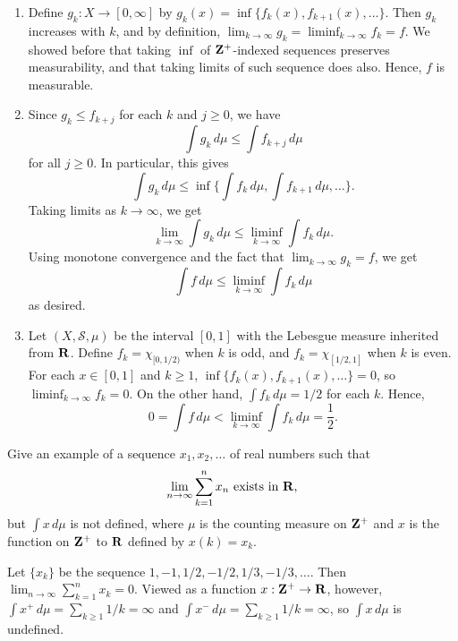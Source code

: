 \documentclass[11pt,oneside]{book}
\begin{document}
\begin{solution}
    \begin{enumerate}[label=(\alph*)]
        \item Define $g_k: X \to [0, \infty]$ by $g_k(x) = \inf\{f_k(x), f_{k+1}(x), \ldots\}$. Then $g_k$ increases with $k$, and by definition, $\lim_{k \to \infty} g_k = \liminf_{k \to \infty} f_k = f$. We showed before that taking $\inf$ of $\mathbf{Z}^+$-indexed sequences preserves measurability, and that taking limits of such sequence does also. Hence, $f$ is measurable.

        \item Since $g_k \leq f_{k+j}$ for each $k$ and $j \geq 0$, we have \[\int g_k \, d\mu \leq \int f_{k+j} \, d\mu\] for all $j \geq 0$. In particular, this gives \[\int g_k \, d\mu \leq \inf\bigg\{ \int f_{k} \, d\mu, \int f_{k+1} \, d\mu, \ldots \bigg\}.\] Taking limits as $k \to \infty$, we get \[\lim_{k \to \infty} \int g_k \, d\mu \leq \liminf_{k \to \infty} \int f_k \, d\mu.\] Using monotone convergence and the fact that $\lim_{k \to \infty} g_k = f$, we get \[\int f \, d\mu \leq \liminf_{k \to \infty} \int f_k \, d\mu\] as desired.

        \item Let $(X, \mathscr{S}, \mu)$ be the interval $[0, 1]$ with the Lebesgue measure inherited from $\mathbf{R}$. Define $f_k = \chi_{[0, 1/2)}$ when $k$ is odd, and $f_k = \chi_{[1/2, 1]}$ when $k$ is even. For each $x \in [0, 1]$ and $k \geq 1$, $\inf\{f_k(x), f_{k+1}(x), \ldots\} = 0$, so $\liminf_{k \to \infty} f_k = 0$. On the other hand, $\int f_k \, d\mu = 1/2$ for each $k$. Hence, \[0 = \int f \, d\mu < \liminf_{k \to \infty} \int f_k \, d\mu = \frac 12.\]
    \end{enumerate}
\end{solution}

\begin{exercise}
    Give an example of a sequence $x_1, x_2, \ldots$ of real numbers such that \[\lim_{n \to \infty} \sum_{k=1}^n x_n \text{ exists in $\mathbf{R}$,}\] but $\int x \, d\mu$ is not defined, where $\mu$ is the counting measure on $\mathbf{Z}^+$ and $x$ is the function on $\mathbf{Z}^+$ to $\mathbf{R}$ defined by $x(k) = x_k$.
\end{exercise}

\begin{solution}
    Let $\{x_k\}$ be the sequence $1, -1, 1/2, -1/2, 1/3, -1/3, \ldots$. Then $\lim_{n \to \infty} \sum_{k=1}^n x_k = 0$. Viewed as a function $x: \mathbf{Z}^+ \to \mathbf{R}$, however, $\int x^+ \, d\mu = \sum_{k \geq 1} 1/k = \infty$ and $\int x^- \, d\mu = \sum_{k \geq 1} 1/k = \infty$, so $\int x \, d\mu$ is undefined.
\end{solution}
\end{document}
